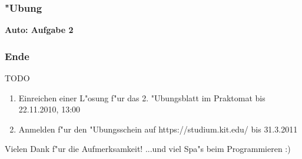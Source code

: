 \documentclass{beamer}
\begin{document}
\begin{frame}
\frametitle{"Ubung}
\begin{center}
\textbf{\Huge Auto: Aufgabe 2}
\end{center}
\end{frame}


\begin{frame}
\frametitle{Ende}
\begin{block}{TODO}
\begin{enumerate}
\item Einreichen einer L"osung f"ur das 2. "Ubungsblatt im Praktomat bis \alert{22.11.2010, 13:00}
\item Anmelden f"ur den "Ubungsschein auf https://studium.kit.edu/ bis \alert{31.3.2011}
\end{enumerate}
\end{block}

\begin{block}{Vielen Dank f"ur die Aufmerksamkeit!}
...und viel Spa"s beim Programmieren :)
\end{block}
\end{frame}
\end{document}
